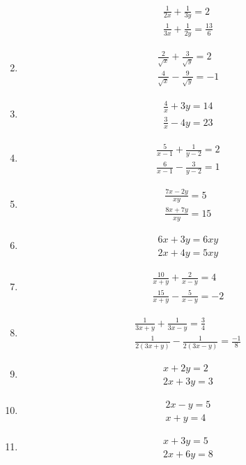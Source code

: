 \begin{enumerate}[label=\thesubsection.\arabic*,ref=\thesubsection.\theenumi]
\begin{align}
\frac{1}{2x}+\frac{1}{3y}=2 \\ \frac{1}{3x}+\frac{1}{2y}=\frac{13}{6}
\end{align}
\item
\begin{align}
\frac{2}{\sqrt{x}}+\frac{3}{\sqrt{y}}=2\\
\frac{4}{\sqrt{x}}-\frac{9}{\sqrt{y}}=-1
\end{align}
\item
\begin{align}
\frac{4}{x}+3y=14\\ \frac{3}{x}-4y=23
\end{align}
\item
\begin{align}
\frac{5}{x-1}+\frac{1}{y-2}=2\\ \frac{6}{x-1}-\frac{3}{y-2}=1
\end{align}
\item
\begin{align}
\frac{7x-2y}{xy}=5\\ \frac{8x+7y}{xy}=15
\end{align}
\item
\begin{align}
6x+3y=6xy\\ 2x+4y=5xy
\end{align}
\item
\begin{align}
\frac{10}{x+y}+\frac{2}{x-y}=4\\ \frac{15}{x+y}-\frac{5}{x-y}=-2
\end{align}
\item
\begin{align}
\frac{1}{3x+y}+\frac{1}{3x-y}=\frac{3}{4}\\ \frac{1}{2(3x+y)}-\frac{1}{2(3x-y)}=\frac{-1}{8}
\end{align}
\item  
\begin{align}
 x+2y = 2\\
2x+3y = 3
\end{align}
\item
\begin{align}
 2x-y = 5\\
 x+y = 4
\end{align}
\item
\begin{align}
 x+3y = 5\\
 2x+6y= 8
\end{align}

\end{enumerate}
